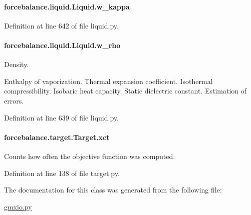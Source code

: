 \hypertarget{classforcebalance_1_1liquid_1_1Liquid_a6b262d9343247a902063bf62d5f19108}{
\paragraph[{w\-\_\-kappa}]{\setlength{\rightskip}{0pt plus 5cm}forcebalance.\-liquid.\-Liquid.\-w\-\_\-kappa\hspace{0.3cm}{\ttfamily [inherited]}}}\label{classforcebalance_1_1liquid_1_1Liquid_a6b262d9343247a902063bf62d5f19108}


Definition at line 642 of file liquid.\-py.

\hypertarget{classforcebalance_1_1liquid_1_1Liquid_aef8ad1dda086bde6f48130d273af9784}{
\paragraph[{w\-\_\-rho}]{\setlength{\rightskip}{0pt plus 5cm}forcebalance.\-liquid.\-Liquid.\-w\-\_\-rho\hspace{0.3cm}{\ttfamily [inherited]}}}\label{classforcebalance_1_1liquid_1_1Liquid_aef8ad1dda086bde6f48130d273af9784}


Density. 

Enthalpy of vaporization. Thermal expansion coefficient. Isothermal compressibility. Isobaric heat capacity. Static dielectric constant. Estimation of errors. 

Definition at line 639 of file liquid.\-py.

\hypertarget{classforcebalance_1_1target_1_1Target_aad2e385cfbf7b4a68f1c2cb41133fe82}{
\paragraph[{xct}]{\setlength{\rightskip}{0pt plus 5cm}forcebalance.\-target.\-Target.\-xct\hspace{0.3cm}{\ttfamily [inherited]}}}\label{classforcebalance_1_1target_1_1Target_aad2e385cfbf7b4a68f1c2cb41133fe82}


Counts how often the objective function was computed. 



Definition at line 138 of file target.\-py.



The documentation for this class was generated from the following file\-:\begin{DoxyCompactItemize}
\item 
\hyperlink{gmxio_8py}{gmxio.\-py}\end{DoxyCompactItemize}
